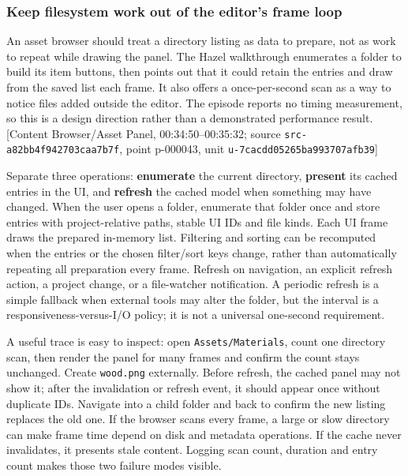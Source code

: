 \subsubsection{Keep filesystem work out of the editor's frame loop}\label{06-engine-ii-ch027-keep-filesystem-work-out-of-the-editors-frame-loop}

\hypertarget{06-engine-ii-ch027-keep-filesystem-work-out-of-the-editors-frame-loop}{}

An asset browser should treat a directory listing as data to prepare, not as work to repeat while drawing the panel. The Hazel walkthrough enumerates a folder to build its item buttons, then points out that it could retain the entries and draw from the saved list each frame. It also offers a once-per-second scan as a way to notice files added outside the editor. The episode reports no timing measurement, so this is a design direction rather than a demonstrated performance result. {[}Content Browser/Asset Panel, 00:34:50--00:35:32; source \texttt{src-a82bb4f942703caa7b7f}, point p-000043, unit \texttt{u-7cacdd05265ba993707afb39}{]}

Separate three operations: \textbf{enumerate} the current directory, \textbf{present} its cached entries in the UI, and \textbf{refresh} the cached model when something may have changed. When the user opens a folder, enumerate that folder once and store entries with project-relative paths, stable UI IDs and file kinds. Each UI frame draws the prepared in-memory list. Filtering and sorting can be recomputed when the entries or the chosen filter/sort keys change, rather than automatically repeating all preparation every frame. Refresh on navigation, an explicit refresh action, a project change, or a file-watcher notification. A periodic refresh is a simple fallback when external tools may alter the folder, but the interval is a responsiveness-versus-I/O policy; it is not a universal one-second requirement.

A useful trace is easy to inspect: open \texttt{Assets/Materials}, count one directory scan, then render the panel for many frames and confirm the count stays unchanged. Create \texttt{wood.png} externally. Before refresh, the cached panel may not show it; after the invalidation or refresh event, it should appear once without duplicate IDs. Navigate into a child folder and back to confirm the new listing replaces the old one. If the browser scans every frame, a large or slow directory can make frame time depend on disk and metadata operations. If the cache never invalidates, it presents stale content. Logging scan count, duration and entry count makes those two failure modes visible.

